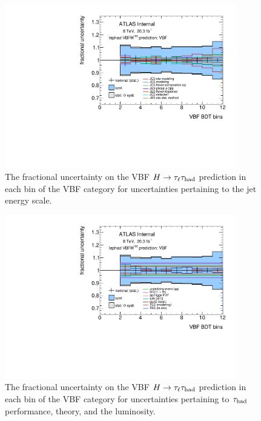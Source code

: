 \begin{figure}[tp]
  \includegraphics[width=0.90\textwidth]{figures/uncertainties/uncertainties_lephad_paper14_8TeV_VBFH125_JES_VBF}
  \caption{The fractional uncertainty on the VBF $H\rightarrow\tau_\ell\tau_\text{had}$ prediction in each bin of the VBF category for uncertainties pertaining to the jet energy scale.}
  \label{fig:backgrounds-uncertainties-vbfjes}
\end{figure}

\begin{figure}[tp]
  \includegraphics[width=0.90\textwidth]{figures/uncertainties/uncertainties_lephad_paper14_8TeV_VBFH125_other_VBF}
  \caption{The fractional uncertainty on the VBF $H\rightarrow\tau_\ell\tau_\text{had}$ prediction in each bin of the VBF category for uncertainties pertaining to $\tau_\text{had}$ performance, theory, and the luminosity.}
  \label{fig:backgrounds-uncertainties-vbfother}
\end{figure}

